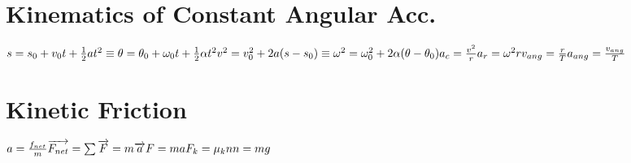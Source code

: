 \documentclass[14pt]{article}
\begin{document}
\begin{paracol}{2}
        \section*{Kinematics of Constant Angular Acc.}
        \begin{fleqn}
            $
            s=s_0 + v_0t + \frac{1}{2}at^2 \equiv \theta = \theta_0 + \omega_0 t + \frac{1}{2}\alpha t^2 \newline
            v^2 = v_0^2+2a(s-s_0)  \equiv \omega^2 = \omega_0 ^2 + 2 \alpha (\theta - \theta_0)\newline
            a_c = \frac{v^2}{r} \newline
            a_r = \omega^2r \newline
            v_{ang} = \frac{r}{T} \newline
            a_{ang} = \frac{v_{ang}}{T} \newline
            $
        \end{fleqn}
        \switchcolumn
        \section*{Kinetic Friction}
        \begin{fleqn}
            $
            a=\frac{f_{net}}{m} \newline
            \overrightarrow{F_{net}} = \sum \overrightarrow{F} = m \overrightarrow{a} \newline
            F=ma \newline F_k = \mu_{k}n \newline n=mg
            $
        \end{fleqn}
    \end{paracol}
\end{document}

